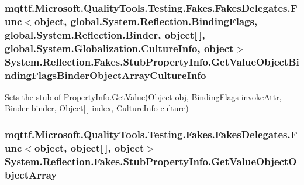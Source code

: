 \hypertarget{class_system_1_1_reflection_1_1_fakes_1_1_stub_property_info_a596b78a40206bb153343033a4b801aff}{
\subsubsection[{Get\-Value\-Object\-Binding\-Flags\-Binder\-Object\-Array\-Culture\-Info}]{\setlength{\rightskip}{0pt plus 5cm}mqttf.\-Microsoft.\-Quality\-Tools.\-Testing.\-Fakes.\-Fakes\-Delegates.\-Func$<$object, global.\-System.\-Reflection.\-Binding\-Flags, global.\-System.\-Reflection.\-Binder, object\mbox{[}$\,$\mbox{]}, global.\-System.\-Globalization.\-Culture\-Info, object$>$ System.\-Reflection.\-Fakes.\-Stub\-Property\-Info.\-Get\-Value\-Object\-Binding\-Flags\-Binder\-Object\-Array\-Culture\-Info}}\label{class_system_1_1_reflection_1_1_fakes_1_1_stub_property_info_a596b78a40206bb153343033a4b801aff}


Sets the stub of Property\-Info.\-Get\-Value(\-Object obj, Binding\-Flags invoke\-Attr, Binder binder, Object\mbox{[}$\,$\mbox{]} index, Culture\-Info culture)

\hypertarget{class_system_1_1_reflection_1_1_fakes_1_1_stub_property_info_a063b803178a8134027c2d80d9283db37}{
\subsubsection[{Get\-Value\-Object\-Object\-Array}]{\setlength{\rightskip}{0pt plus 5cm}mqttf.\-Microsoft.\-Quality\-Tools.\-Testing.\-Fakes.\-Fakes\-Delegates.\-Func$<$object, object\mbox{[}$\,$\mbox{]}, object$>$ System.\-Reflection.\-Fakes.\-Stub\-Property\-Info.\-Get\-Value\-Object\-Object\-Array}}\label{class_system_1_1_reflection_1_1_fakes_1_1_stub_property_info_a063b803178a8134027c2d80d9283db37}


